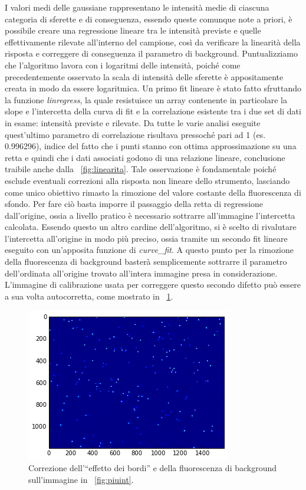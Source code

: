 I valori medi delle gaussiane rappresentano le intensità medie di ciascuna categoria di sferette e di conseguenza, essendo queste comunque note a priori, è possibile creare una regressione lineare tra le intensità previste e quelle effettivamente rilevate all'interno del campione, così da verificare la linearità della risposta e correggere di conseguenza il parametro di background. 
Puntualizziamo che l'algoritmo lavora con i logaritmi delle intensità, poiché come precedentemente osservato la scala di intensità delle sferette è appositamente creata in modo da essere logaritmica.
Un primo fit lineare è stato fatto sfruttando la funzione \textit{linregress}, la quale resistuisce un array contenente in particolare la slope e l'intercetta della curva di fit e la correlazione esistente tra i due set di dati in esame: intensità previste e rilevate.
Da tutte le varie analisi eseguite quest'ultimo parametro di correlazione risultava pressoché pari ad 1 (es. 0.996296), indice del fatto che i punti stanno con ottima approssimazione su una retta e quindi che i dati associati godono di una relazione lineare, conclusione traibile anche dalla \figurename~\ref{fig:linearita}.
Tale osservazione è fondamentale poiché esclude eventuali correzioni alla risposta non lineare dello strumento, lasciando come unico obiettivo rimasto la rimozione del valore costante della fluorescenza di sfondo. 
Per fare ciò basta imporre il passaggio della retta di regressione dall'origine, ossia a livello pratico è necessario sottrarre all'immagine l'intercetta calcolata. 
Essendo questo un altro cardine dell'algoritmo, si è scelto di rivalutare l'intercetta all'origine in modo più preciso, ossia tramite un secondo fit lineare eseguito con un'apposita funzione di \textit{curve\_fit}.
A questo punto per la rimozione della fluorescenza di background basterà semplicemente sottrarre il parametro dell'ordinata all'origine trovato all'intera immagine presa in considerazione. 
L'immagine di calibrazione usata per correggere questo secondo difetto può essere a sua volta autocorretta, come mostrato in \figurename~\ref{fig:piuintcorr}.

\begin{figure}
 \centering
 \includegraphics[scale=1]{img/CAP3piuintcorr.png}
 \caption{\small{Correzione dell'``effetto dei bordi'' e della fluorescenza di background sull'immagine in \figurename~\ref{fig:piuint}.}}
 \label{fig:piuintcorr}
\end{figure}

